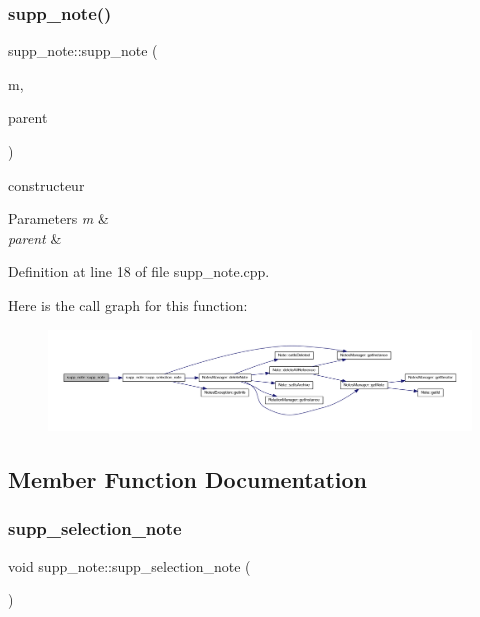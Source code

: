 \subsubsection{\texorpdfstring{supp\+\_\+note()}{supp\_note()}}
{\footnotesize\ttfamily supp\+\_\+note\+::supp\+\_\+note (\begin{DoxyParamCaption}\item[{Q\+Standard\+Item\+Model $\ast$}]{m,  }\item[{Q\+Widget $\ast$}]{parent }\end{DoxyParamCaption})}



constructeur 


\begin{DoxyParams}{Parameters}
{\em m} & \\
\hline
{\em parent} & \\
\hline
\end{DoxyParams}


Definition at line 18 of file supp\+\_\+note.\+cpp.

Here is the call graph for this function\+:\nopagebreak
\begin{figure}[H]
\begin{center}
\leavevmode
\includegraphics[width=350pt]{classsupp__note_a0a8f0c351866f8026cabfd981b919889_cgraph}
\end{center}
\end{figure}


\subsection{Member Function Documentation}
\mbox{\label{classsupp__note_a5dbf6d3af5c94d71f42eeb2cf626c9d3}} 
\subsubsection{\texorpdfstring{supp\+\_\+selection\+\_\+note}{supp\_selection\_note}}
{\footnotesize\ttfamily void supp\+\_\+note\+::supp\+\_\+selection\+\_\+note (\begin{DoxyParamCaption}{ }\end{DoxyParamCaption})\hspace{0.3cm}{\ttfamily [slot]}}




